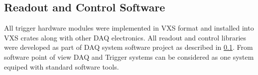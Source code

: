 \subsection{Readout and Control Software}

All trigger hardware modules were implemented in VXS format and installed into VXS crates along with other DAQ electronics. All readout and control libraries were developed as part of DAQ system software project as described in \ref{}. From software point of view DAQ and Trigger systems can be considered as one system equiped with standard software tools.